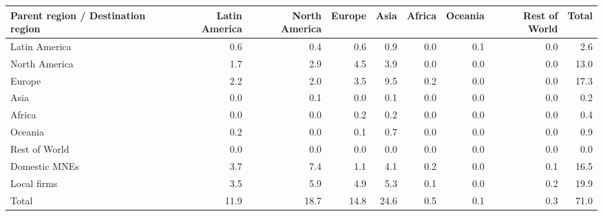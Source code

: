 \begin{tabular}{lrrrrrrrr}
\toprule
Parent region / Destination region & Latin America & North America & Europe & Asia & Africa & Oceania & Rest of World & Total \\
\midrule
Latin America & 0.6 & 0.4 & 0.6 & 0.9 & 0.0 & 0.1 & 0.0 & 2.6 \\
North America & 1.7 & 2.9 & 4.5 & 3.9 & 0.0 & 0.0 & 0.0 & 13.0 \\
Europe & 2.2 & 2.0 & 3.5 & 9.5 & 0.2 & 0.0 & 0.0 & 17.3 \\
Asia & 0.0 & 0.1 & 0.0 & 0.1 & 0.0 & 0.0 & 0.0 & 0.2 \\
Africa & 0.0 & 0.0 & 0.2 & 0.2 & 0.0 & 0.0 & 0.0 & 0.4 \\
Oceania & 0.2 & 0.0 & 0.1 & 0.7 & 0.0 & 0.0 & 0.0 & 0.9 \\
Rest of World & 0.0 & 0.0 & 0.0 & 0.0 & 0.0 & 0.0 & 0.0 & 0.0 \\
Domestic MNEs & 3.7 & 7.4 & 1.1 & 4.1 & 0.2 & 0.0 & 0.1 & 16.5 \\
Local firms & 3.5 & 5.9 & 4.9 & 5.3 & 0.1 & 0.0 & 0.2 & 19.9 \\
\midrule
Total & 11.9 & 18.7 & 14.8 & 24.6 & 0.5 & 0.1 & 0.3 & 71.0 \\
\bottomrule
\end{tabular}

